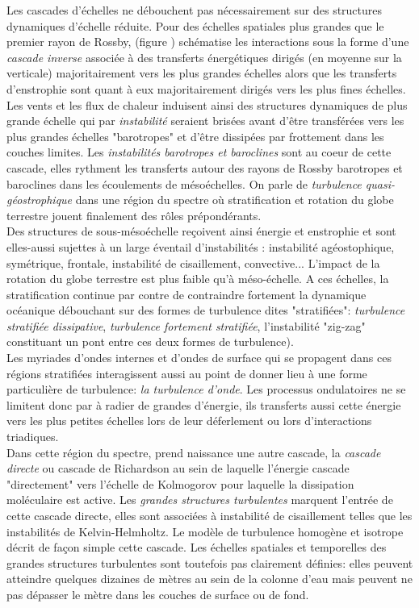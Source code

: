 Les cascades d'échelles ne débouchent pas nécessairement sur des structures dynamiques d'échelle réduite. Pour des échelles spatiales plus grandes que le premier rayon de Rossby, \cite{salmon_baroclinic_1980} (figure ) schématise les interactions sous la forme d'une \textit{cascade inverse} associée à des transferts énergétiques dirigés (en moyenne sur la verticale) majoritairement vers les plus grandes échelles alors que les transferts d'enstrophie sont quant à eux majoritairement dirigés vers les plus fines échelles. Les vents et les flux de chaleur induisent ainsi des structures dynamiques de plus grande échelle qui par \textit{instabilité} seraient brisées avant d'être transférées vers les plus grandes échelles "barotropes" et d'être dissipées par frottement dans les couches limites. Les \textit{instabilités barotropes et baroclines} sont au coeur de cette cascade, elles rythment les transferts autour des rayons de Rossby barotropes et baroclines dans les écoulements de mésoéchelles. On parle de \textit{turbulence quasi-géostrophique} \cite{charney_78} dans une région du spectre où stratification et rotation du globe terrestre jouent finalement des rôles prépondérants.\\
Des structures de sous-mésoéchelle reçoivent ainsi énergie et enstrophie et sont elles-aussi sujettes à un large éventail d'instabilités \cite{mcwilliams_submesoscale_2016}: instabilité agéostophique, symétrique, frontale, instabilité de cisaillement, convective... L'impact de la rotation du globe terrestre est plus faible qu'à méso-échelle. A ces échelles, la stratification continue par contre de contraindre fortement la dynamique océanique débouchant sur des formes de turbulence dites "stratifiées": \textit{turbulence stratifiée dissipative}, \textit{turbulence fortement stratifiée}, l'instabilité "zig-zag" constituant un pont entre ces deux formes de turbulence).\\
Les myriades d'ondes internes et d'ondes de surface qui se propagent dans ces régions stratifiées interagissent aussi au point de donner lieu à une forme particulière de turbulence: \textit{la turbulence d'onde}. Les processus ondulatoires ne se limitent donc par à radier de grandes d'énergie, ils transferts aussi cette énergie vers les plus petites échelles lors de leur déferlement ou lors d'interactions triadiques.\\
Dans cette région du spectre, prend naissance une autre cascade, la \textit{cascade directe} ou cascade de Richardson au sein de laquelle l'énergie cascade "directement" vers l'échelle de Kolmogorov pour laquelle la dissipation moléculaire est active. Les \textit{grandes structures turbulentes} marquent l'entrée de cette cascade directe, elles sont associées à instabilité de cisaillement telles que les instabilités de Kelvin-Helmholtz. Le modèle de turbulence homogène et isotrope décrit de façon simple cette cascade. Les échelles spatiales et temporelles des grandes structures turbulentes sont toutefois pas clairement définies: elles peuvent atteindre quelques dizaines de mètres au sein de la colonne d'eau mais peuvent ne pas dépasser le mètre dans les couches de surface ou de fond.\\
